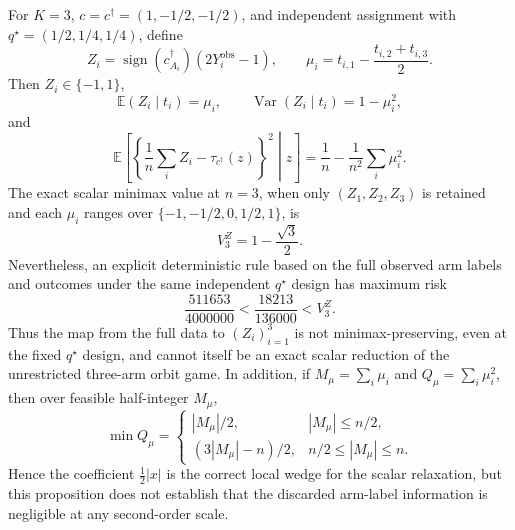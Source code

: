 For \(K=3\), \(c=c^\dagger=(1,-1/2,-1/2)\), and independent assignment with \(q^\star=(1/2,1/4,1/4)\), define
\[
 Z_i=\operatorname{sign}(c_{A_i}^\dagger)(2Y_i^{\mathrm{obs}}-1),
 \qquad
 \mu_i=t_{i,1}-\frac{t_{i,2}+t_{i,3}}{2}.
\]
Then \(Z_i\in\{-1,1\}\),
\[
 \mathbb E(Z_i\mid t_i)=\mu_i,
 \qquad
 \operatorname{Var}(Z_i\mid t_i)=1-\mu_i^2,
\]
and
\[
 \mathbb E\!\left[\left\{\frac1n\sum_iZ_i-\tau_{c^\dagger}(z)\right\}^2\middle|z\right]
 =\frac1n-\frac1{n^2}\sum_i\mu_i^2.
\]
The exact scalar minimax value at \(n=3\), when only \((Z_1,Z_2,Z_3)\) is retained and each \(\mu_i\) ranges over \(\{-1,-1/2,0,1/2,1\}\), is
\[
 V_3^Z=1-\frac{\sqrt3}{2}.
\]
Nevertheless, an explicit deterministic rule based on the full observed arm labels and outcomes under the same independent \(q^\star\) design has maximum risk
\[
 \frac{511653}{4000000}<\frac{18213}{136000}<V_3^Z.
\]
Thus the map from the full data to \((Z_i)_{i=1}^3\) is not minimax-preserving, even at the fixed \(q^\star\) design, and cannot itself be an exact scalar reduction of the unrestricted three-arm orbit game.  In addition, if \(M_\mu=\sum_i\mu_i\) and \(Q_\mu=\sum_i\mu_i^2\), then over feasible half-integer \(M_\mu\),
\[
 \min Q_\mu=
 \begin{cases}
 |M_\mu|/2,&|M_\mu|\leq n/2,\\
 (3|M_\mu|-n)/2,&n/2\leq|M_\mu|\leq n.
 \end{cases}
\]
Hence the coefficient \(\tfrac12|x|\) is the correct local wedge for the scalar relaxation, but this proposition does not establish that the discarded arm-label information is negligible at any second-order scale.